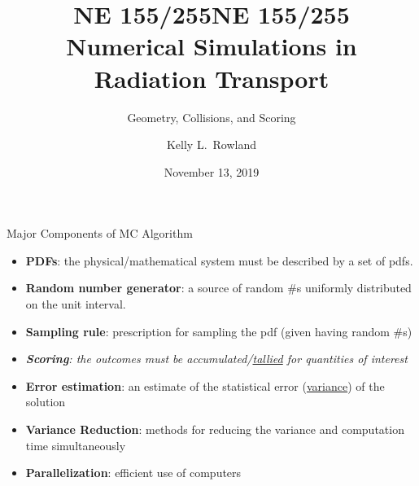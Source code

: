 \documentclass[xcolor=x11names,compress,handout]{beamer}
\title{NE 155/255}
\author{Kelly L.\ Rowland}
\date{November 13, 2019}
\renewcommand{\(}{\begin{columns}}
\renewcommand{\)}{\end{columns}}
\newcommand{\<}[1]{\begin{column}{#1}}
\renewcommand{\>}{\end{column}}
\begin{document}
\begin{frame}
\title{NE 155/255\\Numerical Simulations in Radiation Transport}
\subtitle{Geometry, Collisions, and Scoring}
\titlepage
\end{frame}

\begin{frame}{Major Components of MC Algorithm}

\begin{itemize}
  \item \textbf{PDFs}: the physical/mathematical system must be described by a set of pdfs.
  \item \textbf{Random number generator}: a source of random \#s uniformly distributed on the unit interval.
  \item \textbf{Sampling rule}: prescription for sampling the pdf (given having random \#s)
  \item \textit{\textbf{Scoring}: the outcomes must be accumulated/\underline{tallied} for quantities of interest}
  \item \textbf{Error estimation}: an estimate of the statistical error (\underline{variance}) of the solution
  \item \textbf{Variance Reduction}: methods for reducing the variance and computation time simultaneously
  \item \textbf{Parallelization}: efficient use of computers
\end{itemize}
\end{frame}
\end{document}

